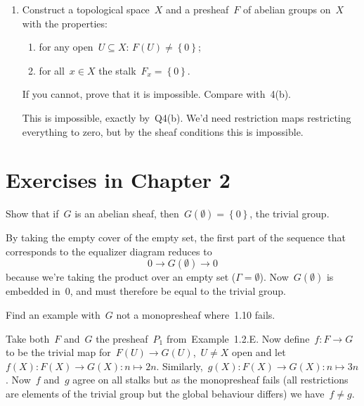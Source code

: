 \documentclass[a4paper,11pt,oneside,openany,article]{memoir}
\begin{document}
\begin{enumerate}
  \item Construct a topological space~$X$ and a presheaf~$F$ of abelian groups on~$X$ with the properties:
    \begin{enumerate}
      \item for any open~$U\subseteq X$: $F(U)\neq\left\{ 0 \right\}$;
      \item for all~$x\in X$ the stalk~$F_x=\left\{ 0 \right\}$.
    \end{enumerate}
    If you cannot, prove that it is impossible. Compare with~4(b).

    \begin{solution}
      This is impossible, exactly by~Q4(b). We'd need restriction maps restricting everything to zero, but by the sheaf conditions this is impossible.
    \end{solution}
\end{enumerate}

\clearpage

\chapter{Exercises in Chapter 2}
\begin{exercise}[1.9]
  Show that if~$G$ is an abelian sheaf, then~$G(\emptyset)=\left\{ 0 \right\}$, the trivial group.

  \begin{solution}
    By taking the empty cover of the empty set, the first part of the sequence that corresponds to the equalizer diagram reduces to
    \begin{equation}
      0\to G(\emptyset)\to 0
    \end{equation}
    because we're taking the product over an empty set ($\Gamma=\emptyset$). Now~$G(\emptyset)$ is embedded in~$0$, and must therefore be equal to the trivial group.
  \end{solution}
\end{exercise}

\begin{exercise}[1.12]
  Find an example with~$G$ not a monopresheaf where~1.10 fails.

  \begin{solution}
    Take both~$F$ and~$G$ the presheaf~$P_1$ from~Example~1.2.E. Now define~$f\colon F\to G$ to be the trivial map for~$F(U)\to G(U)$,~$U\neq X$ open and let~$f(X)\colon F(X)\to G(X):n\mapsto 2n$. Similarly,~$g(X)\colon F(X)\to G(X):n\mapsto 3n$. Now~$f$ and~$g$ agree on all stalks but as the monopresheaf fails (all restrictions are elements of the trivial group but the global behaviour differs) we have~$f\neq g$.
  \end{solution}
\end{exercise}
\end{document}
